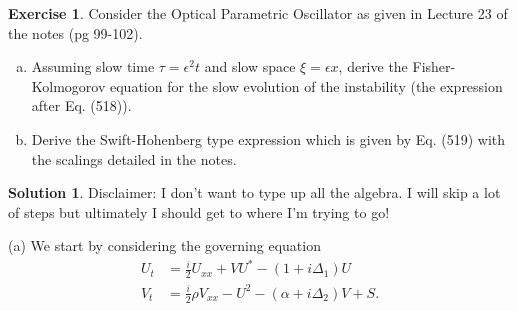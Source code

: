 \documentclass[12pt]{article}
\theoremstyle{definition}
\newtheorem{exer}{Exercise}
\newtheorem{sol}{Solution}
\theoremstyle{remark}
\begin{document}
\begin{exer}
    Consider the Optical Parametric Oscillator as given in Lecture 23 of the notes (pg 99-102).

    \begin{enumerate}[(a)]
        \item Assuming slow time $\tau = \epsilon^{2} t$ and slow space $\xi = \epsilon x$, derive the Fisher-Kolmogorov equation for the slow evolution of the instability (the expression after Eq. (518)).
        \item Derive the Swift-Hohenberg type expression which is given by Eq. (519) with the scalings detailed in the notes.
    \end{enumerate}
\end{exer}

\begin{sol}
    Disclaimer: I don't want to type up all the algebra. I will skip a lot of steps but ultimately I should get to where I'm trying to go!

    (a) We start by considering the governing equation
    \begin{align*}
        U_{t} &= \frac{i}{2} U_{xx} + V U^{*} - (1 + i \Delta_{1}) U\\
        V_{t} &= \frac{i}{2} \rho V_{xx} - U^{2} - (\alpha + i \Delta_{2}) V + S.
    \end{align*}


\end{sol}
\end{document}
